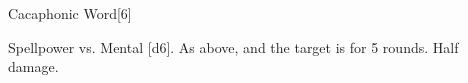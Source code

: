 
\begin{spellsection}{Cacaphonic Word}[6]
    \begin{spellheader}
    \end{spellheader}
    \begin{spellcontent}
        \begin{spelltargetinginfo}
        \end{spelltargetinginfo}
        \begin{spelleffects}
            \begin{spellattack}{Spellpower vs. Mental}
                \spellsuccess {}[d6].
                \spellcritical As above, and the target is \disoriented for 5 rounds.
                \spellfailure Half damage.
            \end{spellattack}
        \end{spelleffects}
    \end{spellcontent}
    \begin{spellfooter}
        \miscastexplode
    \end{spellfooter}
\end{spellsection}

